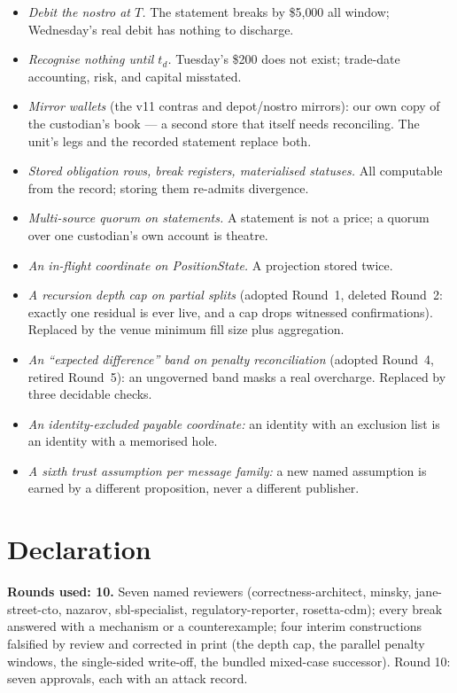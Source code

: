 \documentclass[11pt]{article}
\begin{document}
\begin{itemize}
\item \emph{Debit the nostro at $T$.} The statement breaks by \$5{,}000 all
window; Wednesday's real debit has nothing to discharge.
\item \emph{Recognise nothing until $t_d$.} Tuesday's \$200 does not exist;
trade-date accounting, risk, and capital misstated.
\item \emph{Mirror wallets} (the v11 contras and depot/nostro mirrors): our own
copy of the custodian's book --- a second store that itself needs reconciling.
The unit's legs and the recorded statement replace both.
\item \emph{Stored obligation rows, break registers, materialised statuses.} All
computable from the record; storing them re-admits divergence.
\item \emph{Multi-source quorum on statements.} A statement is not a price; a
quorum over one custodian's own account is theatre.
\item \emph{An in-flight coordinate on PositionState.} A projection stored twice.
\item \emph{A recursion depth cap on partial splits} (adopted Round~1, deleted
Round~2: exactly one residual is ever live, and a cap drops witnessed
confirmations). Replaced by the venue minimum fill size plus aggregation.
\item \emph{An ``expected difference'' band on penalty reconciliation} (adopted
Round~4, retired Round~5): an ungoverned band masks a real overcharge. Replaced by
three decidable checks.
\item \emph{An identity-excluded payable coordinate:} an identity with an
exclusion list is an identity with a memorised hole.
\item \emph{A sixth trust assumption per message family:} a new named assumption
is earned by a different proposition, never a different publisher.
\end{itemize}

\section{Declaration}

\textbf{Rounds used: 10.} Seven named reviewers (correctness-architect, minsky,
jane-street-cto, nazarov, sbl-specialist, regulatory-reporter, rosetta-cdm); every
break answered with a mechanism or a counterexample; four interim constructions
falsified by review and corrected in print (the depth cap, the parallel penalty
windows, the single-sided write-off, the bundled mixed-case successor). Round 10:
seven approvals, each with an attack record.
\end{document}
